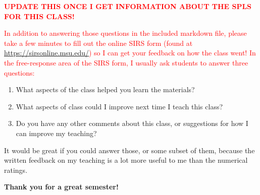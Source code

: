 \documentclass[10pt]{article}
\begin{document}
\textbf{\textcolor{red}{UPDATE THIS ONCE I GET INFORMATION ABOUT THE
  SPLS FOR THIS CLASS!}}


\textcolor{red}{In addition to answering those questions in the included markdown
file,
please take a few 
minutes to fill out the online SIRS form (found at \href{https://sirsonline.msu.edu/}{https://sirsonline.msu.edu/}) 
so I can get your feedback on how the class went!  In the free-response area 
of the SIRS form, I usually ask students to answer three questions:}


\begin{enumerate}

  \item What aspects of the class helped you learn the materials?
  \item What aspects of class could I improve next time I teach this class?
  \item Do you have any other comments about this class, or suggestions for how I can improve my teaching?

\end{enumerate}

It would be great if you could answer those, or some subset of them, because
the written feedback on my teaching is a lot more useful to me than the numerical
ratings.

\vspace{3mm}

\noindent
\textbf{Thank you for a great semester!}
\end{document}
